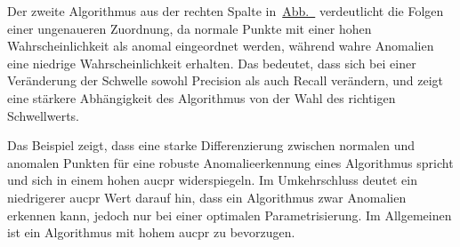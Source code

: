 Der zweite Algorithmus aus der rechten Spalte in~\hyperref[fig:auc_pr_beispiel]{Abb.~} verdeutlicht die Folgen einer
ungenaueren Zuordnung, da normale Punkte mit einer hohen Wahrscheinlichkeit als anomal eingeordnet werden, während wahre Anomalien eine niedrige
Wahrscheinlichkeit erhalten. Das bedeutet, dass sich bei einer Veränderung der Schwelle sowohl Precision als auch Recall verändern, und zeigt
eine stärkere Abhängigkeit des Algorithmus von der Wahl des richtigen Schwellwerts.

Das Beispiel zeigt, dass eine starke Differenzierung zwischen normalen und anomalen Punkten für eine robuste Anomalieerkennung eines Algorithmus
spricht und sich in einem hohen \ac{aucpr} widerspiegeln. Im Umkehrschluss deutet ein niedrigerer \ac{aucpr} Wert darauf hin, dass ein Algorithmus zwar
Anomalien erkennen kann, jedoch nur bei einer optimalen Parametrisierung. Im Allgemeinen ist ein Algorithmus mit hohem \ac{aucpr} zu bevorzugen.